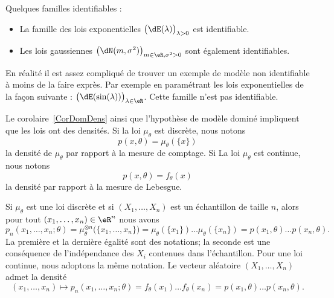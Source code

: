 \begin{example}
	Quelques familles identifiables :
	\begin{itemize}
		\item
		      La famille des lois exponentielles \( \big( \dE(\lambda) \big)_{\lambda>0}\) est identifiable.
		\item
		      Les lois gaussiennes \( \big( \dN(m,\sigma^2) \big)_{m\in\eR,\sigma^2>0}\) sont également identifiables.
	\end{itemize}
	En réalité il est assez compliqué de trouver un exemple de modèle non identifiable à moins de la faire exprès. Par exemple en paramétrant les lois exponentielles de la façon suivante : \( \big( \dE(\sin(\lambda)) \big)_{\lambda\in\eR}\). Cette famille n'est pas identifiable.
\end{example}

Le corolaire~\ref{CorDomDens} ainsi que l'hypothèse de modèle dominé impliquent que les lois ont des densités. Si la loi \( \mu_{\theta}\) est discrète, nous notons
\begin{equation}
	p(x,\theta)=\mu_{\theta}(\{ x \})
\end{equation}
la densité de \( \mu_{\theta}\) par rapport à la mesure de comptage. Si La loi \( \mu_{\theta}\) est continue, nous notons
\begin{equation}
	p(x,\theta)=f_{\theta}(x)
\end{equation}
la densité par rapport à la mesure de Lebesgue.

Si \( \mu_{\theta}\) est une loi discrète et si \( (X_1,\ldots,X_n)\) est un échantillon de taille \( n\), alors pour tout \( (x_1,\ldots,x_n)\in\eR^n\) nous avons
\begin{equation}
	p_n(x_1,\ldots,x_n;\theta)=\mu_{\theta}^{\otimes n}\big( \{ x_1,\ldots,x_n \} \big)=\mu_{\theta}(\{ x_1 \})\ldots\mu_{\theta}(\{ x_n \})=p(x_1,\theta)\ldots p(x_n,\theta).
\end{equation}
La première et la dernière égalité sont des notations; la seconde est une conséquence de l'indépendance des \( X_i\) contenues dans l'échantillon. Pour une loi continue, nous adoptons la même notation. Le vecteur aléatoire \( (X_1,\ldots,X_n)\) admet la densité
\begin{equation}
	(x_1,\ldots,x_n)\mapsto p_n(x_1,\ldots,x_n;\theta)=f_{\theta}(x_1)\ldots f_{\theta}(x_n)=p(x_1,\theta)\ldots p(x_n,\theta).
\end{equation}

